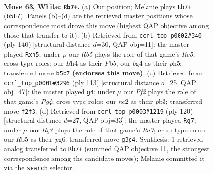 \documentclass[11pt]{article}
\begin{document}
\clearpage

\begin{figure}[p]\centering
\begin{subfigure}{0.46\textwidth}\centering
\resizebox{\linewidth}{!}{%
\newchessgame
\chessboard[
  setfen={8/5k2/7r/1R6/r5bB/6R1/2n2P2/7K w - - 5 63},
  showmover=false,
  pgfstyle=straightmove, color=movearrow, markmove={b5-b7}
]}
\caption{}
\end{subfigure}\hfill
\begin{subfigure}{0.46\textwidth}\centering
\resizebox{\linewidth}{!}{%
\newchessgame
\chessboard[
  setfen={8/8/1B5b/1PR4p/4k2P/1r6/4K3/8 w - - 6 71},
  showmover=false,
  pgfstyle=straightmove, color=movearrow, markmove={c5-h5}
]}
\caption{}
\end{subfigure}
\\[4pt]
\begin{subfigure}{0.46\textwidth}\centering
\resizebox{\linewidth}{!}{%
\newchessgame
\chessboard[
  setfen={8/8/5R2/1k3bp1/8/1P2KB1r/8/8 b - - 7 57},
  showmover=false,
  pgfstyle=straightmove, color=movearrow, markmove={g5-g4}
]}
\caption{}
\end{subfigure}\hfill
\begin{subfigure}{0.46\textwidth}\centering
\resizebox{\linewidth}{!}{%
\newchessgame
\chessboard[
  setfen={4k3/R7/6p1/5b2/8/2r1BK2/7P/8 w - - 26 61},
  showmover=false,
  pgfstyle=straightmove, color=movearrow, markmove={a7-g7}
]}
\caption{}
\end{subfigure}
\caption{\textbf{Move 63, White: \texttt{Rb7+}.} (a) Our position; Melanie plays \texttt{Rb7+} (\texttt{b5b7}). Panels (b)--(d) are the retrieved master positions whose correspondence most drove this move (highest QAP objective among those that transfer to it). (b) Retrieved from \texttt{ccrl\_top\_p0002\#340} (ply 140) [structural distance $d$=30, QAP obj=11]: the master played \texttt{Rxh5}; under $\mu$ our \emph{Rb5} plays the role of that game's \emph{Rc5}; cross-type roles: our \emph{B}h4 as their \emph{P}b5, our \emph{b}g4 as their \emph{p}h5; transferred move \texttt{b5b7} \textbf{(endorses this move)}. (c) Retrieved from \texttt{ccrl\_top\_p0001\#3296} (ply 113) [structural distance $d$=25, QAP obj=47]: the master played \texttt{g4}; under $\mu$ our \emph{Pf2} plays the role of that game's \emph{Pg4}; cross-type roles: our \emph{n}c2 as their \emph{p}b3; transferred move \texttt{f2f3}. (d) Retrieved from \texttt{ccrl\_top\_p0003\#1219} (ply 120) [structural distance $d$=27, QAP obj=33]: the master played \texttt{Rg7}; under $\mu$ our \emph{Rg3} plays the role of that game's \emph{Ra7}; cross-type roles: our \emph{R}b5 as their \emph{p}g6; transferred move \texttt{g3g4}. Synthesis: 1 retrieved analog transferred to \texttt{Rb7+} (summed QAP objective 11, the strongest correspondence among the candidate moves); Melanie committed it via the \texttt{search} selector.}
\label{fig:thought-m124}
\end{figure}
\end{document}
